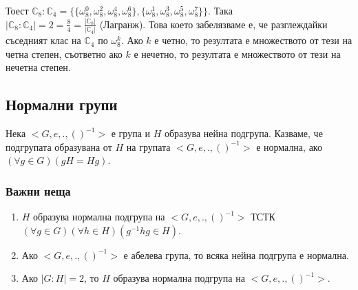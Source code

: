 \documentclass[12pt]{article}
\begin{document}
Тоест \(\mathbb{C}_8 : \mathbb{C}_4 = \{\{\omega_8^0, \omega_8^2, \omega_8^4, \omega_8^6\}, \{\omega_8^1, \omega_8^3, \omega_8^5, \omega_8^7\}\}\).
Така \\
\(|\mathbb{C}_8 : \mathbb{C}_4| = 2 = \displaystyle\frac{8}{4} = \displaystyle\frac{|\mathbb{C}_8|}{|\mathbb{C}_4|}\) (Лагранж).
Това което забелязваме е, че разглеждайки съседният клас на \(\mathbb{C}_4\) по \(\omega_8^k\). Ако \(k\) е четно, то резултата е множеството от тези на четна степен,
съответно ако \(k\) е нечетно, то резултата е множеството от тези на нечетна степен.
\subsection{Нормални групи}
Нека \(<G, e, . , ()^{-1}>\) е група и \(H\) образува нейна подгрупа.
Казваме, че подгрупата образувана от \(H\) на групата \(<G, e, . , ()^{-1}>\) е нормална, ако \((\forall g \in G)(gH = Hg)\).
\subsubsection{Важни неща}
\begin{enumerate}
    \item \(H\) образува нормална подгрупа на \(<G, e, . , ()^{-1}>\) ТСТК \\
    \((\forall g \in G)(\forall h \in H)(g^{-1}hg \in H)\).
    \item Ако \(<G, e, . , ()^{-1}>\) е абелева група, то всяка нейна подгрупа е нормална.
    \item Ако \(|G : H| = 2\), то \(H\) образува нормална подгрупа на \(<G, e, . , ()^{-1}>\).
\end{enumerate}
\end{document}
